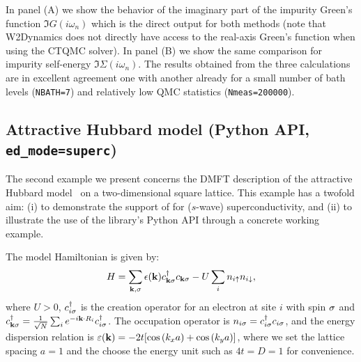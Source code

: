 \documentclass[edipack_sp.tex]{subfiles}
\begin{document}
In panel (A) we show the behavior of the imaginary part of the impurity Green's function $\Im{G}(i\omega_n)$ which is the direct output for both methods (note that W2Dynamics does not directly have access to the real-axis Green's function when using the CTQMC solver). In panel (B) we show the same comparison for impurity self-energy $\Im{\Sigma}(i\omega_n)$. 
The results obtained from the three calculations are in excellent agreement one with another already for a small number of bath levels ({\tt NBATH=7}) and relatively low QMC statistics ({\tt Nmeas=200000}).   



















\subsection{Attractive Hubbard model (Python API, {\tt ed\_mode=superc})}\label{SecExamplesAHM}
The second example we present concerns the DMFT description of the 
attractive Hubbard model~\cite{Caffarel1994PRL,Toschi2005NJP,Toschi2005PRB} on a two-dimensional square lattice. This 
example has a twofold aim: (i) to demonstrate the support of \NAME 
for ($s$-wave) superconductivity, and (ii) to illustrate the use of 
the library's Python API through a concrete working example. 

The 
model Hamiltonian is given by:
$$
H = \sum_{{\bf k},\sigma} \epsilon({\bf k}) c^\dagger_{{\bf k}\sigma} c_{{\bf k}\sigma} 
    - U \sum_i n_{i\uparrow} n_{i\downarrow},
$$
where $U > 0$, $c^\dagger_{i\sigma}$ 
is the creation operator for an electron at site $i$ with spin $\sigma$ and $c^\dagger_{{\bf k}\sigma} = \tfrac{1}{\sqrt{N}} 
\sum_i e^{-i{\bf k} \cdot R_i} c^\dagger_{i\sigma}$. 
The occupation operator is $n_{i\sigma} = c^\dagger_{i\sigma} c_{i\sigma}$, and 
the energy dispersion relation is $\varepsilon({\bf k})=-2t[\cos{(k_x a)}+
\cos{(k_y a)}]$, where we set the lattice spacing 
$a=1$  and the choose the energy unit such as $4t=D=1$ for convenience.
\end{document}

